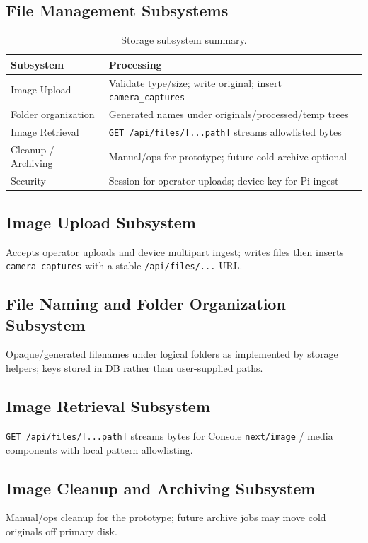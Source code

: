 \documentclass[11pt,letterpaper]{article}
\begin{document}
\subsection{File Management Subsystems}
\begin{table}[H]
\centering
\begin{tabular}{@{}p{4.5cm}p{9.2cm}@{}}
\toprule
\textbf{Subsystem} & \textbf{Processing} \\
\midrule
Image Upload & Validate type/size; write original; insert \texttt{camera\_captures} \\
Folder organization & Generated names under originals/processed/temp trees \\
Image Retrieval & \texttt{GET /api/files/[...path]} streams allowlisted bytes \\
Cleanup / Archiving & Manual/ops for prototype; future cold archive optional \\
Security & Session for operator uploads; device key for Pi ingest \\
\bottomrule
\end{tabular}
\caption{Storage subsystem summary.}
\label{tab:storage}
\end{table}

\subsection{Image Upload Subsystem}
Accepts operator uploads and device multipart ingest; writes files then inserts
\texttt{camera\_captures} with a stable \texttt{/api/files/...} URL.

\subsection{File Naming and Folder Organization Subsystem}
Opaque/generated filenames under logical folders as implemented by storage helpers; keys stored
in DB rather than user-supplied paths.

\subsection{Image Retrieval Subsystem}
\texttt{GET /api/files/[...path]} streams bytes for Console \texttt{next/image} / media
components with local pattern allowlisting.

\subsection{Image Cleanup and Archiving Subsystem}
Manual/ops cleanup for the prototype; future archive jobs may move cold originals off primary
disk.
\end{document}
